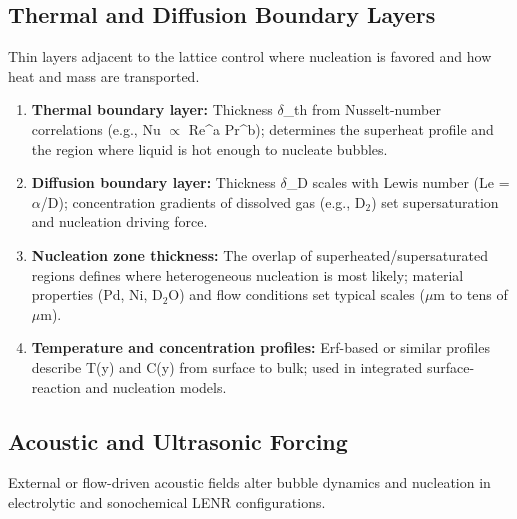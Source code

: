 \documentclass[11pt,a4paper]{article}
\begin{document}
\subsection{Thermal and Diffusion Boundary Layers}

Thin layers adjacent to the lattice control where nucleation is favored and how heat and mass are transported.

\begin{enumerate}
\def\labelenumi{\arabic{enumi}.}
\item
  \textbf{Thermal boundary layer:} Thickness $\delta$\_th from Nusselt-number correlations (e.g., Nu $\propto$ Re\^{}a Pr\^{}b); determines the superheat profile and the region where liquid is hot enough to nucleate bubbles.
\item
  \textbf{Diffusion boundary layer:} Thickness $\delta$\_D scales with Lewis number (Le = $\alpha$/D); concentration gradients of dissolved gas (e.g., D$_{2}$) set supersaturation and nucleation driving force.
\item
  \textbf{Nucleation zone thickness:} The overlap of superheated/supersaturated regions defines where heterogeneous nucleation is most likely; material properties (Pd, Ni, D$_{2}$O) and flow conditions set typical scales ($\mu$m to tens of $\mu$m).
\item
  \textbf{Temperature and concentration profiles:} Erf-based or similar profiles describe T(y) and C(y) from surface to bulk; used in integrated surface-reaction and nucleation models.
\end{enumerate}

\subsection{Acoustic and Ultrasonic Forcing}

External or flow-driven acoustic fields alter bubble dynamics and nucleation in electrolytic and sonochemical LENR configurations.
\end{document}
